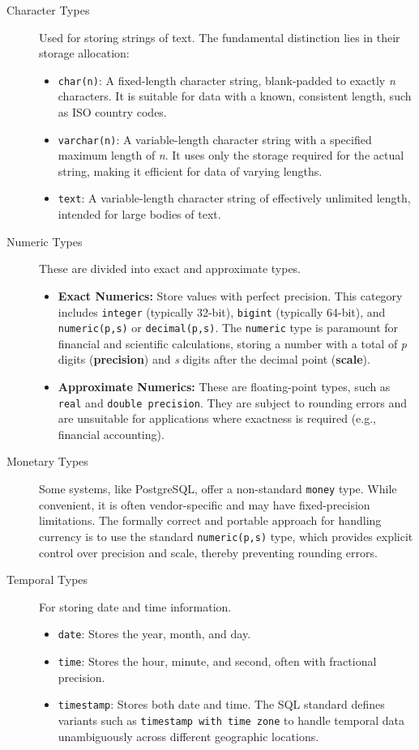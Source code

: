 \begin{description}
    \item[Character Types] Used for storing strings of text. The fundamental distinction lies in their storage allocation:
    \begin{itemize}
        \item \texttt{char(n)}: A fixed-length character string, blank-padded to exactly \textit{n} characters. It is suitable for data with a known, consistent length, such as ISO country codes.
        \item \texttt{varchar(n)}: A variable-length character string with a specified maximum length of \textit{n}. It uses only the storage required for the actual string, making it efficient for data of varying lengths.
        \item \texttt{text}: A variable-length character string of effectively unlimited length, intended for large bodies of text.
    \end{itemize}

    \item[Numeric Types] These are divided into exact and approximate types.
    \begin{itemize}
        \item \textbf{Exact Numerics:} Store values with perfect precision. This category includes \texttt{integer} (typically 32-bit), \texttt{bigint} (typically 64-bit), and \texttt{numeric(p,s)} or \texttt{decimal(p,s)}. The \texttt{numeric} type is paramount for financial and scientific calculations, storing a number with a total of \textit{p} digits (\textbf{precision}) and \textit{s} digits after the decimal point (\textbf{scale}).
        \item \textbf{Approximate Numerics:} These are floating-point types, such as \texttt{real} and \texttt{double precision}. They are subject to rounding errors and are unsuitable for applications where exactness is required (e.g., financial accounting).
    \end{itemize}

    \item[Monetary Types] Some systems, like PostgreSQL, offer a non-standard \texttt{money} type. While convenient, it is often vendor-specific and may have fixed-precision limitations. The formally correct and portable approach for handling currency is to use the standard \texttt{numeric(p,s)} type, which provides explicit control over precision and scale, thereby preventing rounding errors.

    \item[Temporal Types] For storing date and time information.
    \begin{itemize}
        \item \texttt{date}: Stores the year, month, and day.
        \item \texttt{time}: Stores the hour, minute, and second, often with fractional precision.
        \item \texttt{timestamp}: Stores both date and time. The SQL standard defines variants such as \texttt{timestamp with time zone} to handle temporal data unambiguously across different geographic locations.
    \end{itemize}


\end{description}
